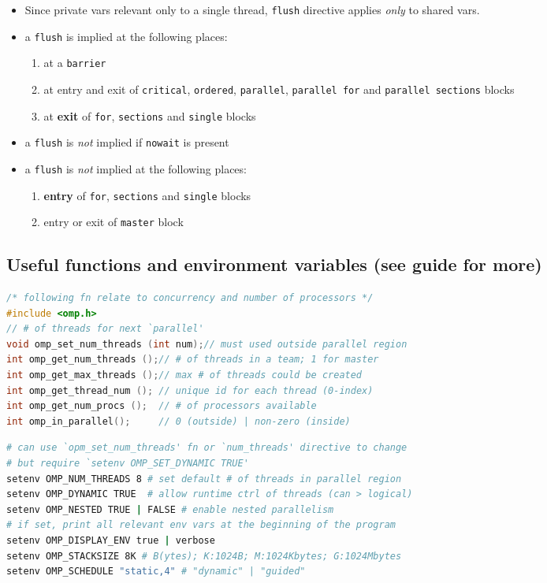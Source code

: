 \documentclass[8pt,a4paper,landscape]{extarticle}
\begin{document}
\begin{multicols*}{3}
\begin{itemize}
\item Since private vars relevant only to a single thread, \texttt{flush} directive applies \emph{only} to shared vars.
\item a \texttt{flush} is implied at the following places:
  \begin{enumerate}
  \item at a \texttt{barrier}
  \item at entry and exit of \texttt{critical}, \texttt{ordered}, \texttt{parallel}, \texttt{parallel for} and \texttt{parallel sections} blocks
  \item at \textbf{exit} of \texttt{for}, \texttt{sections} and \texttt{single} blocks
  \end{enumerate}
\item a \texttt{flush} is \emph{not} implied if \texttt{nowait} is present
\item a \texttt{flush} is \emph{not} implied at the following places:
  \begin{enumerate}
  \item \textbf{entry} of \texttt{for}, \texttt{sections} and \texttt{single} blocks
  \item entry or exit of \texttt{master} block
  \end{enumerate}
\end{itemize}
\subsection*{Useful functions and environment variables (see guide for more)}
\begin{lstlisting}[language=C]
/* following fn relate to concurrency and number of processors */
#include <omp.h>
// # of threads for next `parallel'
void omp_set_num_threads (int num);// must used outside parallel region
int omp_get_num_threads ();// # of threads in a team; 1 for master
int omp_get_max_threads ();// max # of threads could be created
int omp_get_thread_num (); // unique id for each thread (0-index)
int omp_get_num_procs ();  // # of processors available
int omp_in_parallel();     // 0 (outside) | non-zero (inside)
\end{lstlisting}
\begin{lstlisting}[language=bash,framesep=1pt,xleftmargin=-2pt,xrightmargin=-2pt]
# can use `opm_set_num_threads' fn or `num_threads' directive to change
# but require `setenv OMP_SET_DYNAMIC TRUE'
setenv OMP_NUM_THREADS 8 # set default # of threads in parallel region
setenv OMP_DYNAMIC TRUE  # allow runtime ctrl of threads (can > logical)
setenv OMP_NESTED TRUE | FALSE # enable nested parallelism
# if set, print all relevant env vars at the beginning of the program
setenv OMP_DISPLAY_ENV true | verbose
setenv OMP_STACKSIZE 8K # B(ytes); K:1024B; M:1024Kbytes; G:1024Mbytes
setenv OMP_SCHEDULE "static,4" # "dynamic" | "guided"
\end{lstlisting}


\end{multicols*}
\end{document}
